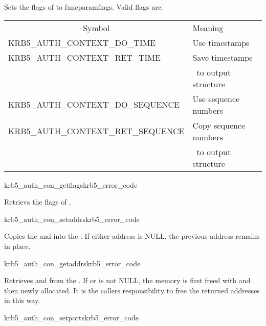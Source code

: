Sets the flags of  to funcparam{flags}. Valid
flags are:

\begin{tabular}{ll}
\multicolumn{1}{c}{Symbol} & Meaning \\
KRB5_AUTH_CONTEXT_DO_TIME & Use timestamps \\
KRB5_AUTH_CONTEXT_RET_TIME & Save timestamps\\ &\  to output structure\\
KRB5_AUTH_CONTEXT_DO_SEQUENCE   & Use sequence numbers \\
KRB5_AUTH_CONTEXT_RET_SEQUENCE  & Copy sequence numbers \\ &\ to output structure\\
\end{tabular}


\begin{funcdecl}{krb5_auth_con_getflags}{krb5_error_code}{\funcinout}
\funcin
{}
\funcout
{}
\end{funcdecl}

Retrievs the flags of .

\begin{funcdecl}{krb5_auth_con_setaddrs}{krb5_error_code}{\funcinout}
\funcin
{}
\end{funcdecl}

Copies the  and  into the
. If either address is NULL, the previous
address remains in place.

\begin{funcdecl}{krb5_auth_con_getaddrs}{krb5_error_code}{\funcinout}
\funcout
{}
\end{funcdecl}

Retrieves   and  from the
. If  or
 is not NULL, the memory is first freed with
 and then newly allocated. It is the callers
responsibility to free the returned addresses in this way.


\begin{funcdecl}{krb5_auth_con_setports}{krb5_error_code}{\funcinout}
\funcin
{}
\end{funcdecl}

